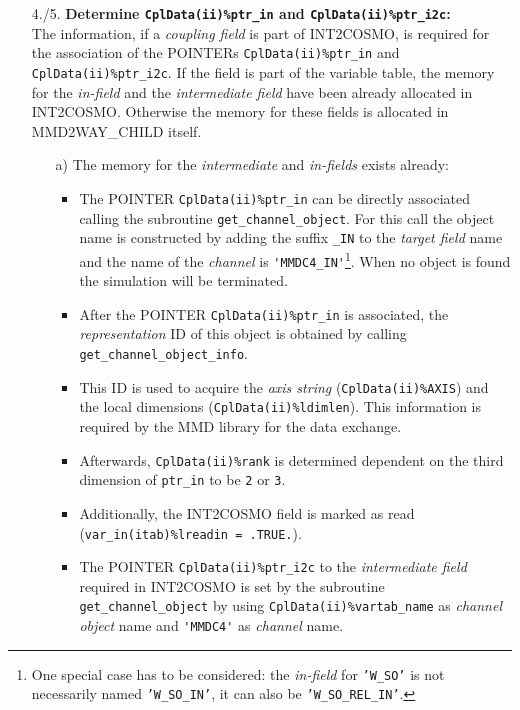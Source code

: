 \documentclass[11pt,twoside]{article}
\begin{document}
\begin{itemize}
\begin{enumerate}
\item[4./5.] {\bf Determine {\tt CplData(ii)\%ptr\_in} and 
{\tt CplData(ii)\%ptr\_i2c}:}\\ %
   The information, if a {\it coupling field} is part of INT2COSMO,
 is required for the association of the {\footnotesize POINTERs} 
\verb|CplData(ii)%ptr_in| and 
   \verb|CplData(ii)%ptr_i2c|.
   If the field is part of the variable table, the memory for the {\it in-field}
   and the {\it intermediate field} have been already allocated in INT2COSMO.
   Otherwise the memory for these fields is allocated in MMD2WAY\_CHILD itself.
   \begin{itemize}%
   \item[a)] The memory for the {\it intermediate} and {\it in-fields} exists 
   already: %
\begin{itemize}%
   \item The {\footnotesize POINTER} \verb|CplData(ii)%ptr_in| can 
    be directly associated calling the subroutine \verb|get_channel_object|. 
    For this call the object name is constructed by adding the
    suffix \verb|_IN| to the {\it target field} name and the name of the 
    {\it channel} is \verb|'MMDC4_IN'|\footnote{One special case has to be 
    considered: the {\it in-field} for {\tt 'W\_SO'} is not necessarily named 
     {\tt 'W\_SO\_IN'}, it can also be  {\tt 'W\_SO\_REL\_IN'}.}.
    When no object is found the simulation will be terminated.
    \item After the {\footnotesize POINTER} \verb|CplData(ii)%ptr_in| is 
    associated, 
    the {\it representation}
     ID of this object is obtained by calling \verb|get_channel_object_info|. 
     \item
     This ID is used to acquire the {\it axis string} (\verb|CplData(ii)%AXIS|) 
     and the local dimensions (\verb|CplData(ii)%ldimlen|). This information is
     required by the MMD library for the data exchange.
     \item Afterwards, \verb|CplData(ii)%rank| is determined dependent on the 
     third dimension of \verb|ptr_in| to be \verb|2| or \verb|3|.
     \item Additionally, the INT2COSMO field is marked as read  
     (\verb|var_in(itab)%lreadin = .TRUE.|). 

     \item The {\footnotesize POINTER} \verb|CplData(ii)%ptr_i2c| to the        
     {\it intermediate field} required in INT2COSMO is
       set by the subroutine \verb|get_channel_object| by using 
      \verb|CplData(ii)%vartab_name| as {\it channel object} name and 
      \verb|'MMDC4'| as {\it channel} name.
\end{itemize}%


\end{itemize}
\end{enumerate}
\end{itemize}
\end{document}
